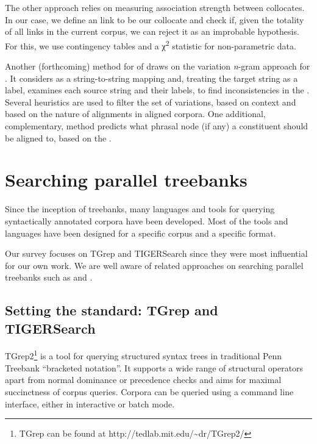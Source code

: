 \documentclass[output=paper]{LSP/langsci}
\begin{document}
The other approach relies on measuring association strength between collocates. In our case, we define an  link to be our collocate and check if, given the totality of all  links in the current corpus, we can reject it as an improbable hypothesis. For this, we use contingency tables and a χ\textsuperscript{2} statistic for non-parametric data. 
 
Another (forthcoming) method for  of  draws on the variation \textit{n}{}-gram approach for  \citep{Dickinson2003b,Dickinson2005}. It considers  as a string-to-string mapping and, treating the target string as a label, examines each source string and their labels, to find inconsistencies in the . Several heuristics are used to filter the set of variations, based on  context and based on the nature of alignments in aligned corpora. One additional, complementary, method predicts what phrasal node (if any) a constituent should be aligned to, based on the . 

\section{Searching parallel treebanks}\label{sec:volk:3}

Since the inception of treebanks, many languages and tools for querying syntactically annotated corpora have been developed. Most of the tools and  languages have been designed for a specific corpus and a specific  format. 

Our survey focuses on TGrep and TIGERSearch since they were most influential for our own work. We are well aware of related approaches on searching parallel treebanks such as \citet{Nygaard2004} and \citet{Petersen2006}. 

\subsection{Setting the standard: TGrep and TIGERSearch}\label{sec:volk:3.1}

TGrep2\footnote{TGrep can be found at http://tedlab.mit.edu/{\textasciitilde}dr/TGrep2/} \citep{Rohde2005} is a tool for querying structured syntax trees in traditional Penn Treebank ``bracketed notation''. It supports a wide range of structural operators apart from normal dominance or precedence checks and aims for maximal succinctness of corpus queries. Corpora can be queried using a command line interface, either in interactive or batch mode. 
\end{document}
